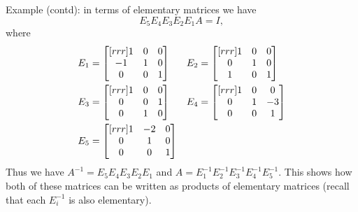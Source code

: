 \begin{frame}
\alert{Example (contd):} in terms of elementary matrices we have 
\[
E_5E_4E_3E_2E_1A=I,
\]
where 
\begin{align*}\scriptsize
E_1&=\begin{bmatrix}[rrr] 1&0&0\\-1&1&0\\ 0&0&1\end{bmatrix}  &  E_2&=\begin{bmatrix}[rrr]1&0&0\\ 0&1&0\\ 1&0&1\end{bmatrix}\\
E_3&=\begin{bmatrix}[rrr]1&0&0\\0&0&1\\0&1&0
\end{bmatrix} &  E_4&=\begin{bmatrix}[rrr]
1&0&0\\ 0&1&-3\\ 0&0&1\end{bmatrix}\\
E_5&=\begin{bmatrix}[rrr]1&-2&0\\0&1&0\\ 0&0&1\end{bmatrix}
\end{align*}
\pause 
Thus we have $A^{-1}=E_5E_4E_3E_2E_1$ and $A=E_1^{-1}E_2^{-1}E_3^{-1}E_4^{-1}E_5^{-1}$.
\bspace
This shows how both of these matrices can be written as products of elementary matrices (recall that each $E_i^{-1}$ is also elementary). 
\end{frame}